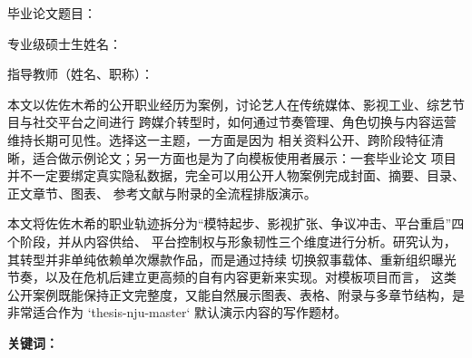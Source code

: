 
\noindent 毕业论文题目：\qquad \njuTitleValue

\vspace{0.9em}
\noindent \njuMajorValue\qquad 专业\qquad \njuEnrollmentYearValue\qquad 级硕士生姓名：\qquad \njuAuthorValue

\vspace{0.9em}
\noindent 指导教师（姓名、职称）：\qquad \njuSupervisorValue

\vspace{1.5em}

本文以佐佐木希的公开职业经历为案例，讨论艺人在传统媒体、影视工业、综艺节目与社交平台之间进行
跨媒介转型时，如何通过节奏管理、角色切换与内容运营维持长期可见性。选择这一主题，一方面是因为
相关资料公开、跨阶段特征清晰，适合做示例论文；另一方面也是为了向模板使用者展示：一套毕业论文
项目并不一定要绑定真实隐私数据，完全可以用公开人物案例完成封面、摘要、目录、正文章节、图表、
参考文献与附录的全流程排版演示。

本文将佐佐木希的职业轨迹拆分为“模特起步、影视扩张、争议冲击、平台重启”四个阶段，并从内容供给、
平台控制权与形象韧性三个维度进行分析。研究认为，其转型并非单纯依赖单次爆款作品，而是通过持续
切换叙事载体、重新组织曝光节奏，以及在危机后建立更高频的自有内容更新来实现。对模板项目而言，
这类公开案例既能保持正文完整度，又能自然展示图表、表格、附录与多章节结构，是非常适合作为
`thesis-nju-master` 默认演示内容的写作题材。

\vspace{1.2em}
\noindent \textbf{关键词：}\njuKeywordsZhValue
